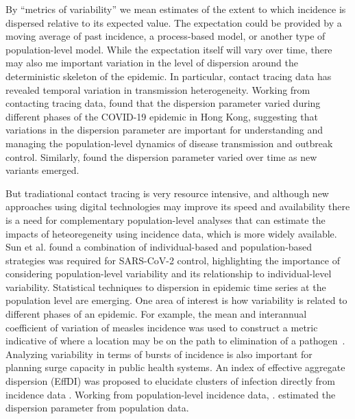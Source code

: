 \documentclass[10pt,letterpaper]{article}
\begin{document}
By ``metrics of variability'' we mean estimates of the extent to which incidence is dispersed relative to its expected value.
The expectation could be provided by a moving average of past incidence, a process-based model, or another type of population-level model. 
While the expectation itself will vary over time, there may also me important variation in the level of dispersion around the deterministic skeleton of the epidemic. 
In particular, contact tracing data has revealed temporal variation in transmission heterogeneity. 
Working from contacting tracing data, \cite{guo2023statistical} found that the dispersion parameter varied during different phases of the COVID-19 epidemic in Hong Kong, suggesting that variations in the dispersion parameter are important for understanding and managing the population-level dynamics of disease transmission and outbreak control.
Similarly, \cite{ko2023time} found the dispersion parameter varied over time as new variants emerged. 

But tradiational contact tracing is very resource intensive, and although new approaches using digital technologies may improve its speed and availability \cite{kretzschmar_impact_2020} there is a need for complementary population-level analyses that can estimate the impacts of heteoregeneity using incidence data, which is more widely available.
Sun et al. \cite{sun_transmission_2021} found a combination of individual-based and population-based strategies was required for SARS-CoV-2 control, highlighting the importance of considering population-level variability and its relationship to individual-level variability. 
Statistical techniques to dispersion in epidemic time series at the population level are emerging.
One area of interest is how variability is related to different phases of an epidemic. For example, the mean and interannual coefficient of variation of measles incidence was used to construct a metric indicative of where a location may be on the path to elimination of a pathogen~\cite{graham_measles_2019}. 
Analyzing variability in terms of bursts of incidence is also important for planning surge capacity in public health systems\cite{wallinga_metropolitan_2018}. 
An index of effective aggregate dispersion (EffDI) was proposed to elucidate clusters of infection directly from incidence data \cite{schneckenreither_assessing_2023}. 
Working from population-level incidence data, \cite{kirkegaard2021superspreading}.
\cite{kirkegaard2021superspreading} estimated the dispersion parameter from population data.
\end{document}
